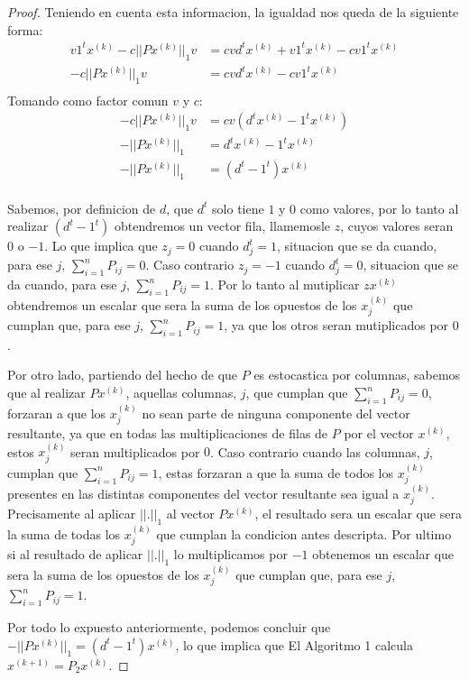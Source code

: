 \begin{proof}
\newline
Teniendo en cuenta esta informacion, la igualdad nos queda de la siguiente forma:
\begin{equation*}
          \begin{aligned}
            v1^{t}x^{(k)} - c||Px^{(k)}||_1v &= cvd^{t}x^{(k)} + v1^{t}x^{(k)} - cv1^{t}x^{(k)}  \\
            - c||Px^{(k)}||_1v &= cvd^{t}x^{(k)} - cv1^{t}x^{(k)}  \\
          \end{aligned}
\end{equation*}
Tomando como factor comun $v$ y $c$:
\begin{equation*}
          \begin{aligned}
            - c||Px^{(k)}||_1v &= cv(d^{t}x^{(k)} - 1^{t}x^{(k)})  \\
            - ||Px^{(k)}||_1 &= d^{t}x^{(k)} - 1^{t}x^{(k)}  \\
            - ||Px^{(k)}||_1 &= (d^{t} - 1^{t})x^{(k)}  \\
          \end{aligned}
\end{equation*}

Sabemos, por definicion de $d$, que $d^{t}$ solo tiene $1$ y $0$ como valores, por lo tanto al realizar $(d^{t} - 1^{t})$ obtendremos un vector fila,
llamemosle $z$, cuyos valores seran $0$ o $-1$. Lo que implica que $z_j = 0$ cuando $d^{t}_j = 1$, situacion que se da cuando, para ese
$j$, $\sum_{i=1}^{n}{P_{ij}} = 0$. Caso contrario $z_j = -1$ cuando $d^{t}_j = 0$, situacion que se da cuando, para ese $j$,
 $\sum_{i=1}^{n}{P_{ij}} = 1$. Por lo tanto al mutiplicar $zx^{(k)}$ obtendremos un escalar que sera la suma de los opuestos de
 los $x^{(k)}_j$ que cumplan que, para ese $j$, $\sum_{i=1}^{n}{P_{ij}} = 1$, ya que los otros seran mutiplicados por $0$.

Por otro lado, partiendo del hecho de que $P$ es estocastica por columnas, sabemos que al realizar $Px^{(k)}$, aquellas columnas, $j$, que
cumplan que $\sum_{i=1}^{n}{P_{ij}} = 0$, forzaran a que los $x^{(k)}_j$ no sean parte de ninguna componente del vector resultante,
ya que en todas las multiplicaciones de filas de $P$ por el vector $x^{(k)}$, estos $x^{(k)}_j$ seran multiplicados por $0$. Caso contrario
cuando las columnas, $j$, cumplan que $\sum_{i=1}^{n}{P_{ij}} = 1$, estas forzaran a que la suma de todos los $x^{(k)}_j$ presentes
en las distintas componentes del vector resultante sea igual a $x^{(k)}_j$. Precisamente al aplicar $||.||_1$ al vector $Px^{(k)}$, el
resultado sera un escalar que sera la suma de todas los $x^{(k)}_j$ que cumplan la condicion antes descripta. Por ultimo si al resultado
de aplicar $||.||_1$ lo multiplicamos por $-1$ obtenemos un escalar que sera la suma de los opuestos de los $x^{(k)}_j$ que cumplan que,
para ese $j$, $\sum_{i=1}^{n}{P_{ij}} = 1$.

Por todo lo expuesto anteriormente, podemos concluir que $- ||Px^{(k)}||_1 = (d^{t} - 1^{t})x^{(k)}$, lo que implica que El Algoritmo 1
calcula $x^{(k+1)} = P_2x^{(k)}$.
\end{proof}

